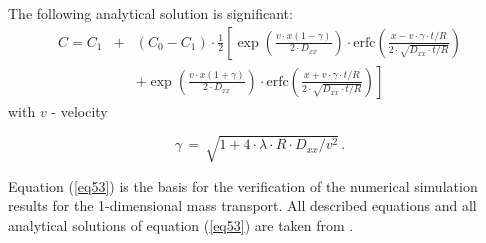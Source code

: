 The following analytical solution is significant:
\begin{eqnarray}
C=C_1&+&\left(C_0-C_1\right)\cdot\frac{1}{2}
\left[
\exp
\left(
\frac{v\cdot x(1-\gamma)}{2\cdot D_{xx}}
\right)
\cdot\mathrm{erfc}
\left(
\frac{x-v\cdot\gamma\cdot t/R}{2\cdot \sqrt{D_{xx}\cdot t/R}}
\right)
\right. \nonumber\\[2.5ex]
& &
+\left.
\exp
\left(
\frac{v\cdot x(1+\gamma)}{2\cdot D_{xx}}
\right)
\cdot\mathrm{erfc}
\left(
\frac{x+v\cdot\gamma\cdot t/R}{2\cdot \sqrt{D_{xx}\cdot t/R}}
\right)
\right]
\label{eq53}
\end{eqnarray}
{\small
with $v$ - velocity
}

\begin{equation}
\gamma\,=\,
\sqrt{1+4\cdot\lambda\cdot R\cdot D_{xx}/v^2}\,.
\label{eq54}
\end{equation}

Equation (\ref{eq53}) is the basis for the verification of the numerical simulation results for the 1-dimensional mass transport. All described equations and all analytical solutions of equation (\ref{eq53}) are taken from \cite{Hab:01}. 